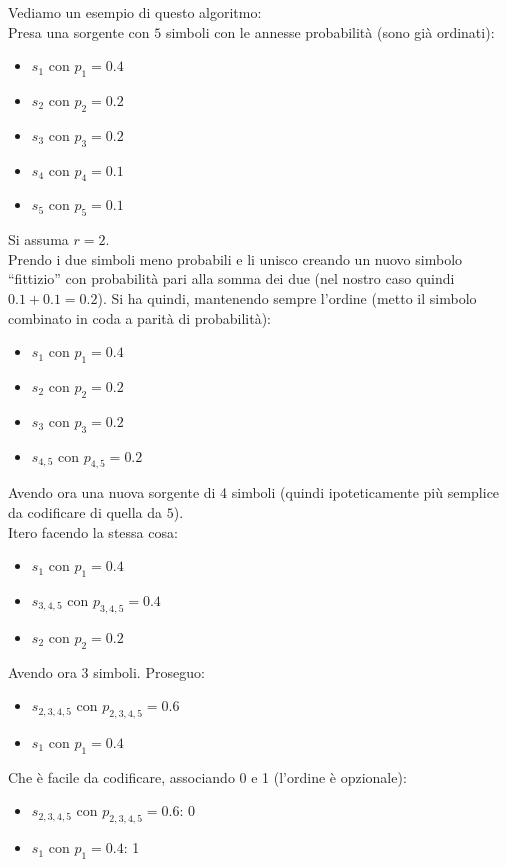 \documentclass[a4paper,12pt, oneside]{book}
\begin{document}
\begin{esempio}
  Vediamo un esempio di questo algoritmo:\\
  Presa una sorgente con $5$ simboli con le annesse probabilità (sono già
  ordinati): 
  \begin{itemize}
    \item $s_1$ con $p_1=0.4$
    \item $s_2$ con $p_2=0.2$
    \item $s_3$ con $p_3=0.2$
    \item $s_4$ con $p_4=0.1$
    \item $s_5$ con $p_5=0.1$
  \end{itemize}
  Si assuma $r=2$.\\
  Prendo i due simboli meno probabili e li unisco creando un nuovo simbolo
  ``fittizio'' con probabilità pari alla somma dei due (nel nostro caso quindi
  $0.1+0.1=0.2$). Si ha quindi, mantenendo sempre l'ordine (metto il simbolo
  combinato in coda a parità di probabilità):
  \begin{itemize}
    \item $s_1$ con $p_1=0.4$
    \item $s_2$ con $p_2=0.2$
    \item $s_3$ con $p_3=0.2$
    \item $s_{4,5}$ con $p_{4,5}=0.2$
  \end{itemize}
  Avendo ora una nuova sorgente di 4 simboli (quindi ipoteticamente più semplice
  da codificare di quella da $5$).\\
  Itero facendo la stessa cosa:
  \begin{itemize}
    \item $s_1$ con $p_1=0.4$
    \item $s_{3,4,5}$ con $p_{3,4,5}=0.4$
    \item $s_2$ con $p_2=0.2$
  \end{itemize}
  Avendo ora 3 simboli. Proseguo:
  \begin{itemize}
    \item $s_{2,3,4,5}$ con $p_{2,3,4,5}=0.6$
    \item $s_1$ con $p_1=0.4$
  \end{itemize}
  Che è facile da codificare, associando 0 e 1 (l'ordine è opzionale):
  \begin{itemize}
    \item $s_{2,3,4,5}$ con $p_{2,3,4,5}=0.6$: 0
    \item $s_1$ con $p_1=0.4$: 1
  \end{itemize}

\end{esempio}
\end{document}
